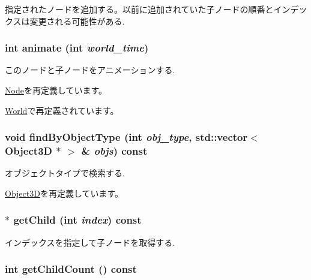 指定されたノードを追加する。以前に追加されていた子ノードの順番とインデックスは変更される可能性がある. \hypertarget{classm3g_1_1Group_8aad1ceab4c2a03609c8a42324ce484d}{
\subsubsection[{animate}]{\setlength{\rightskip}{0pt plus 5cm}int animate (int {\em world\_\-time})}}
\label{classm3g_1_1Group_8aad1ceab4c2a03609c8a42324ce484d}


このノードと子ノードをアニメーションする. 

\hyperlink{classm3g_1_1Node_8aad1ceab4c2a03609c8a42324ce484d}{Node}を再定義しています。

\hyperlink{classm3g_1_1World_8aad1ceab4c2a03609c8a42324ce484d}{World}で再定義されています。\hypertarget{classm3g_1_1Group_4dadb21b568b0230fac106f15040138c}{
\subsubsection[{findByObjectType}]{\setlength{\rightskip}{0pt plus 5cm}void findByObjectType (int {\em obj\_\-type}, \/  std::vector$<$ {\bf Object3D} $\ast$ $>$ \& {\em objs}) const}}
\label{classm3g_1_1Group_4dadb21b568b0230fac106f15040138c}


オブジェクトタイプで検索する. 

\hyperlink{classm3g_1_1Object3D_4dadb21b568b0230fac106f15040138c}{Object3D}を再定義しています。\hypertarget{classm3g_1_1Group_a3af7d07fde341ef751157d274538698}{
\subsubsection[{getChild}]{ $\ast$ getChild (int {\em index}) const}}
\label{classm3g_1_1Group_a3af7d07fde341ef751157d274538698}


インデックスを指定して子ノードを取得する. \hypertarget{classm3g_1_1Group_756d01dca16e146d69bb1881aca8fbb7}{
\subsubsection[{getChildCount}]{\setlength{\rightskip}{0pt plus 5cm}int getChildCount () const}}
\label{classm3g_1_1Group_756d01dca16e146d69bb1881aca8fbb7}


